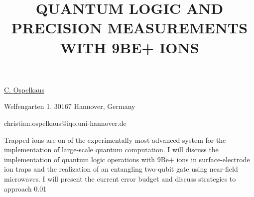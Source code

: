 \title{QUANTUM LOGIC AND PRECISION MEASUREMENTS WITH 9BE+ IONS}

\underline{C. Ospelkaus}  

{\normalsize{\vspace{-4mm}
Welfengarten 1,
30167 Hannover,
Germany



\email christian.ospelkaus@iqo.uni-hannover.de}}

Trapped ions are on of the experimentally most advanced system for the implementation of large-scale quantum computation. I will discuss the implementation of quantum logic operations with 9Be+ ions in surface-electrode ion traps and the realization of an entangling two-qubit gate using near-field microwaves. I will present the current error budget and discuss strategies to approach 0.01%

\vspace{\baselineskip}